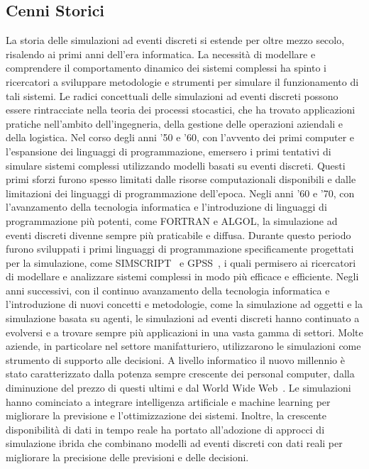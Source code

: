 \documentclass[12pt,a4paper,openright,twoside]{book}
\begin{document}
\subsection{Cenni Storici}
La storia delle simulazioni ad eventi discreti si estende per oltre mezzo secolo, risalendo ai primi anni dell'era informatica. La necessità di modellare e comprendere il comportamento dinamico dei sistemi complessi ha spinto i ricercatori a sviluppare metodologie e strumenti per simulare il funzionamento di tali sistemi.
Le radici concettuali delle simulazioni ad eventi discreti possono essere rintracciate nella teoria dei processi stocastici, che ha trovato applicazioni pratiche nell'ambito dell'ingegneria, della gestione delle operazioni aziendali e della logistica. Nel corso degli anni '50 e '60, con l'avvento dei primi computer e l'espansione dei linguaggi di programmazione, emersero i primi tentativi di simulare sistemi complessi utilizzando modelli basati su eventi discreti. Questi primi sforzi furono spesso limitati dalle risorse computazionali disponibili e dalle limitazioni dei linguaggi di programmazione dell'epoca.
Negli anni '60 e '70, con l'avanzamento della tecnologia informatica e l'introduzione di linguaggi di programmazione più potenti, come FORTRAN e ALGOL, la simulazione ad eventi discreti divenne sempre più praticabile e diffusa. Durante questo periodo furono sviluppati i primi linguaggi di programmazione specificamente progettati per la simulazione, come SIMSCRIPT~\cite{DBLP:journals/ibmsj/DimsdaleM64} e GPSS~\cite{DBLP:journals/tssc/HollandM68}, i quali permisero ai ricercatori di modellare e analizzare sistemi complessi in modo più efficace e efficiente.
Negli anni successivi, con il continuo avanzamento della tecnologia informatica e l'introduzione di nuovi concetti e metodologie, come la simulazione ad oggetti e la simulazione basata su agenti, le simulazioni ad eventi discreti hanno continuato a evolversi e a trovare sempre più applicazioni in una vasta gamma di settori. 
Molte aziende, in particolare nel settore manifatturiero, utilizzarono le simulazioni come strumento di supporto alle decisioni. 
A livello informatico il nuovo millennio è stato caratterizzato dalla potenza sempre crescente dei personal computer, dalla diminuzione del prezzo di questi ultimi e dal World Wide Web~\cite{DBLP:journals/jors/Robinson05}. Le simulazioni hanno cominciato a integrare intelligenza artificiale e machine learning per migliorare la previsione e l'ottimizzazione dei sistemi. Inoltre, la crescente disponibilità di dati in tempo reale ha portato all'adozione di approcci di simulazione ibrida che combinano modelli ad eventi discreti con dati reali per migliorare la precisione delle previsioni e delle decisioni.
\end{document}
